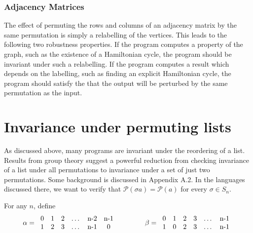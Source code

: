 \documentclass{llncs}
\begin{document}
    \vspace{-0.1in}
    \subsubsection{Adjacency Matrices}

      The effect of permuting the rows and columns of an adjacency matrix by the same
      permutation is simply a relabelling of the vertices.  This leads to the following
      two robustness properties.  If the program computes a
      property of the graph, such as the existence of a Hamiltonian cycle, the program
      should be invariant under such a relabelling.  If the program computes a result
      which depends on the labelling, such as finding an explicit Hamiltonian cycle,
      the program should satisfy the that
      the output will be perturbed by the same permutation as the input.

\section{Invariance under permuting lists}
\label{permlists}

  As discussed above, many programs are invariant under the reordering of a list.
  Results from group theory  suggest a powerful 
  reduction from checking invariance of a list under all permutations
  to invariance under a set of just two permutations.
  Some background is discussed in Appendix A.2.
  In the languages discussed there, we want to verify that
  $\mathcal{P}(\sigma a) = \mathcal{P}(a)$ for every $\sigma\in S_n$.

  For any $n$, define
  \[
    \alpha = 
      \begin{tabular}{c@{\hspace{1em}}c@{\hspace{1em}}c@{\hspace{1em}}c@{\hspace{1em}}c@{\hspace{1em}}c}
      0 & 1 & 2 & \ldots & n-2 & n-1\\
      1 & 2 & 3 & \ldots & n-1 & 0
      \end{tabular}
    \qquad \qquad
    \beta = 
      \begin{tabular}{c@{\hspace{1em}}c@{\hspace{1em}}c@{\hspace{1em}}c@{\hspace{1em}}c@{\hspace{1em}}c}
      0 & 1 & 2 & 3 & \ldots & n-1\\
      1 & 0 & 2 & 3 & \ldots & n-1
      \end{tabular}
  \]
\end{document}

